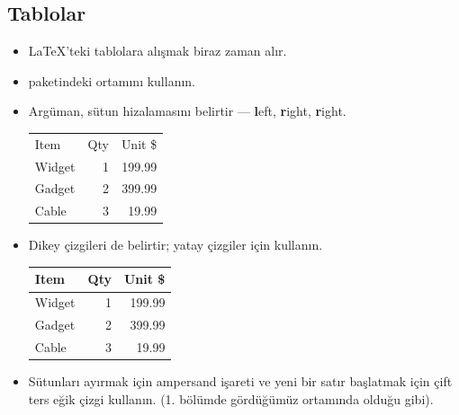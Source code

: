 \documentclass[aspectratio=169]{beamer}
\begin{document}
\subsection{Tablolar}
\begin{frame}[fragile]{\insertsubsection}
\begin{itemize}
\item \LaTeX{}'teki tablolara alışmak biraz zaman alır.
\item {} paketindeki  ortamını kullanın.
\item Argüman, sütun hizalamasını belirtir --- \textbf{l}eft, \textbf{r}ight, \textbf{r}ight.
\begin{exampletwouptiny}
\begin{tabular}{lrr}
Item   & Qty & Unit \$ \\
Widget & 1   & 199.99  \\
Gadget & 2   & 399.99  \\
Cable  & 3   & 19.99   \\
\end{tabular}
\end{exampletwouptiny}
\item Dikey çizgileri de belirtir; yatay çizgiler için  kullanın.
\begin{exampletwouptiny}
\begin{tabular}{|l|r|r|} \hline
Item   & Qty & Unit \$ \\\hline
Widget & 1   & 199.99  \\
Gadget & 2   & 399.99  \\
Cable  & 3   & 19.99   \\\hline
\end{tabular}
\end{exampletwouptiny}
\item Sütunları ayırmak için ampersand \keystrokebftt{\&} işareti ve yeni bir satır başlatmak için çift ters eğik çizgi \keystrokebftt{\bs}\keystrokebftt{\bs} kullanın. (1. bölümde gördüğümüz  ortamında olduğu gibi).
\end{itemize}
\end{frame}

\end{document}
